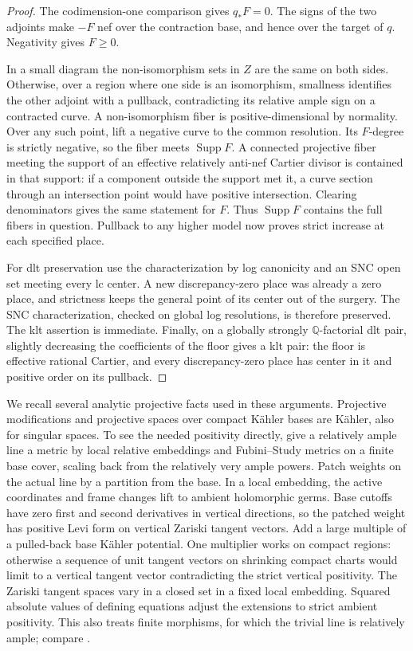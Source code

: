 \documentclass[11pt,letterpaper]{article}
\newcommand{\Q}{\mathbb{Q}}
\DeclareMathOperator{\Supp}{Supp}
\theoremstyle{definition}
\theoremstyle{remark}
\begin{document}
\begin{proof}
The codimension-one comparison gives $q_*F=0$.  The signs of the two
adjoints make $-F$ nef over the contraction base, and hence over the
target of $q$.  Negativity gives $F\geq0$.

In a small diagram the non-isomorphism sets in $Z$ are the same on
both sides.  Otherwise, over a region where one side is an isomorphism,
smallness identifies the other adjoint with a pullback, contradicting
its relative ample sign on a contracted curve.  A non-isomorphism
fiber is positive-dimensional by normality.  Over any such point,
lift a negative curve to the common resolution.  Its $F$-degree is
strictly negative, so the fiber meets $\Supp F$.  A connected
projective fiber meeting the support of an effective relatively
anti-nef Cartier divisor is contained in that support: if a component
outside the support met it, a curve section through an intersection
point would have positive intersection.  Clearing denominators gives
the same statement for $F$.  Thus $\Supp F$ contains the full fibers
in question.  Pullback to any higher model now proves strict increase
at each specified place.

For dlt preservation use the characterization by log canonicity and an
SNC open set meeting every lc center.  A new discrepancy-zero place
was already a zero place, and strictness keeps the general point of
its center out of the surgery.  The SNC characterization, checked on
global log resolutions, is therefore preserved.  The klt assertion is
immediate.  Finally, on a globally strongly $\Q$-factorial dlt pair,
slightly decreasing the coefficients of the floor gives a klt pair:
the floor is effective rational Cartier, and every discrepancy-zero
place has center in it and positive order on its pullback.
\end{proof}

We recall several analytic projective facts used in these arguments.
Projective modifications and projective spaces over compact K\"ahler
bases are K\"ahler, also for singular spaces.  To see the needed
positivity directly, give a relatively ample line a metric by local
relative embeddings and Fubini--Study metrics on a finite base cover,
scaling back from the relatively very ample powers.  Patch weights on
the actual line by a partition from the base.  In a local embedding,
the active coordinates and frame changes lift to ambient holomorphic
germs.  Base cutoffs have zero first and second derivatives in
vertical directions, so the patched weight has positive Levi form on
vertical Zariski tangent vectors.  Add a large multiple of a pulled-back
base K\"ahler potential.  One multiplier works on compact regions:
otherwise a sequence of unit tangent vectors on shrinking compact
charts would limit to a vertical tangent vector contradicting the
strict vertical positivity.  The Zariski tangent spaces vary in a
closed set in a fixed local embedding.  Squared absolute values of
defining equations adjust the extensions to strict ambient
positivity.  This also treats finite morphisms, for which the trivial
line is relatively ample; compare \cite{VarouchasKahler}.
\end{document}

